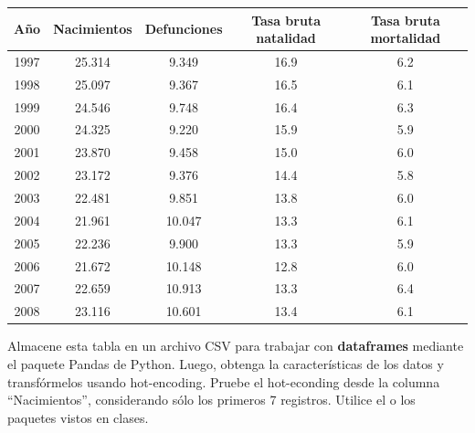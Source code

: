 \documentclass{exam}
\begin{document}
\begin{table}[H]  
\scriptsize
\centering
\begin{tabular}{|c|c|c|c|c|}\hline
    A\~no	& Nacimientos & Defunciones & Tasa bruta natalidad & Tasa bruta mortalidad\\\hline
    1997 & 25.314 & 9.349  & 16.9 & 6.2\\
    1998 & 25.097 & 9.367  & 16.5 & 6.1\\
    1999 & 24.546 & 9.748  & 16.4 & 6.3\\
    2000 & 24.325 & 9.220  & 15.9 & 5.9\\
    2001 & 23.870 & 9.458  & 15.0 & 6.0\\
    2002 & 23.172 & 9.376  & 14.4 & 5.8\\
    2003 & 22.481 & 9.851  & 13.8 & 6.0\\
    2004 & 21.961 & 10.047 & 13.3 & 6.1\\
    2005 & 22.236 & 9.900  & 13.3 & 5.9\\
    2006 & 21.672 & 10.148 & 12.8 & 6.0\\
    2007 & 22.659 & 10.913 & 13.3 & 6.4\\
    2008 & 23.116 & 10.601 & 13.4 & 6.1\\\hline
\end{tabular}
\end{table}

\noindent
    Almacene esta tabla en un archivo CSV para trabajar con \textbf{dataframes} mediante el paquete Pandas de Python. Luego, obtenga la caracter\'isticas de los datos y transf\'ormelos usando hot-encoding. Pruebe el hot-econding desde la columna ``Nacimientos'', considerando s\'olo los primeros 7 registros. Utilice el o los paquetes vistos en clases. 
\end{document}
